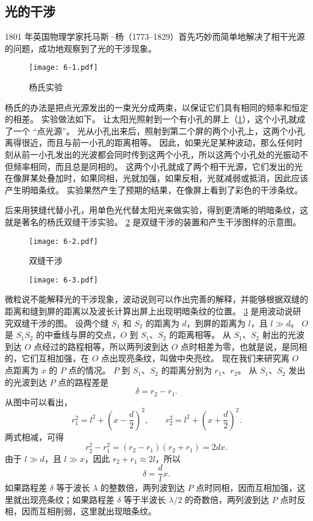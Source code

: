 \subsection{光的干涉}

1801 年英国物理学家托马斯·杨（1773--1829）首先巧妙而简单地解决了相干光源的问题，成功地观察到了光的干涉现象。
\begin{figure}
  \texttt{[image: 6-1.pdf]}
  \caption{杨氏实验}\label{fig:6-1}
\end{figure}

杨氏的办法是把点光源发出的一束光分成两束，以保证它们具有相同的频率和恒定的相差。
实验做法如下。
让太阳光照射到一个有小孔的屏上（\cref{fig:6-1}），这个小孔就成了一个
“点光源”。
光从小孔出来后，照射到第二个屏的两个小孔上，这两个小孔离得很近，而且与前一小孔的距离相等。
因此，如果光足某种波动，那么任何时刻从前一小孔发出的光波都会同时传到这两个小孔，所以这两个小孔处的光振动不但频率相同，而且总是同相的。
这两个小孔就成了两个相干光源，它们发出的光在像屏某处叠加时，如果同相，光就加强，如果反相，光就减弱或抵消，因此应该产生明暗条纹。
实验果然产生了预期的结果，在像屏上看到了彩色的干涉条纹。

后来用狭缝代替小孔，用单色光代替太阳光来做实验，得到更清晰的明暗条纹，这就是著名的杨氏双缝干涉实验。
\cref{fig:6-2} 是双缝干涉的装置和产生干涉图样的示意图。
\begin{figure}
  \texttt{[image: 6-2.pdf]}
  \caption{双缝干涉}\label{fig:6-2}
\end{figure}

\begin{figure}
  \texttt{[image: 6-3.pdf]}
  \caption{}\label{fig:6-3}
\end{figure}
微粒说不能解释光的干涉现象，波动说则可以作出完善的解释，并能够根据双缝的距离和缝到屏的距离以及波长计算出屏上出现明暗条纹的位置。
\cref{fig:6-3} 是用波动说研究双缝干涉的图。
设两个缝 $S_1$ 和 $S_2$ 的距离为 $d$，到屏的距离为 $l$，且 $l\gg d$。
$O$ 是 $S_1S_2$ 的中垂线与屏的交点，$O$ 到 $S_1$、$S_2$ 的距离相等。
从 $S_1$、$S_2$ 射出的光波到达 $O$ 点经过的路程相等，所以两列波到达 $O$ 点时相差为零，也就是说，是同相的，它们互相加强，在 $O$ 点出现亮条纹，叫做中央亮纹。
现在我们来研究离 $O$ 点距离为 $x$ 的 $P$ 点的情况。
$P$ 到 $S_1$、$S_2$ 的距离分别为 $r_1$、$r_2$。
从 $S_1$、$S_2$ 发出的光波到达 $P$ 点的路程差是
\[\delta =r_2-r_1. \]
从图中可以看出，
\[r^2_1=l^2+\left(x-\frac{d}{2}\right)^2,\qquad r^2_2=l^2+\left(x+\frac{d}{2}\right)^2.\]
两式相减，可得
\[r^2_2-r^2_1=(r_2-r_1)(r_2+r_1)=2dx.\]
由于 $l\gg d$，且 $l\gg x$，因此 $r_2+r_1\approx 2l$，所以
\[\delta=\frac{d}{l}x.\]
如果路程差 $\delta$ 等于波长 $\lambda$ 的整数倍，两列波到达 $P$ 点时同相，因而互相加强，这里就出现亮条纹；如果路程差 $\delta$ 等于半波长 $\lambda/2$ 的奇数倍，两列波到达 $P$ 点时反相，因而互相削弱，这里就出现暗条纹。

